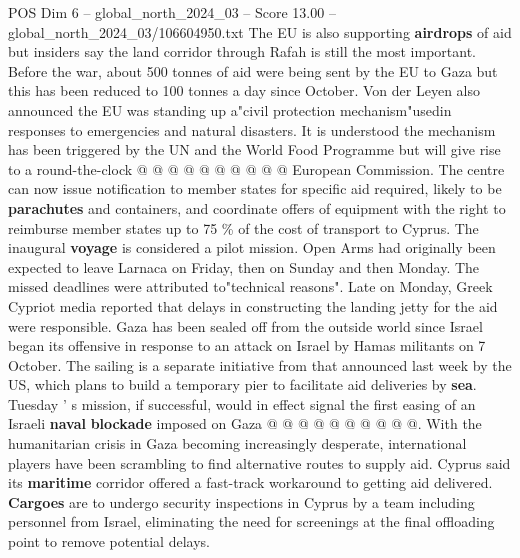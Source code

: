 \begin{textsample}{POS Dim 6 – global\_north\_2024\_03 – Score 13.00 – global\_north\_2024\_03/106604950.txt}
The EU is also supporting \textbf{airdrops} of aid but insiders say the land corridor through Rafah is still the most important.
Before the war, about 500 tonnes of aid were being sent by the EU to Gaza but this has been reduced to 100 tonnes a day since October.
Von der Leyen also announced the EU was standing up a"civil protection mechanism"usedin responses to emergencies and natural disasters.
It is understood the mechanism has been triggered by the UN and the World Food Programme but will give rise to a round-the-clock @ @ @ @ @ @ @ @ @ @ European Commission.
The centre can now issue notification to member states for specific aid required, likely to be \textbf{parachutes} and containers, and coordinate offers of equipment with the right to reimburse member states up to 75 \% of the cost of transport to Cyprus.
The inaugural \textbf{voyage} is considered a pilot mission.
Open Arms had originally been expected to leave Larnaca on Friday, then on Sunday and then Monday.
The missed deadlines were attributed to"technical reasons".
Late on Monday, Greek Cypriot media reported that delays in constructing the landing jetty for the aid were responsible.
Gaza has been sealed off from the outside world since Israel began its offensive in response to an attack on Israel by Hamas militants on 7 October.
The sailing is a separate initiative from that announced last week by the US, which plans to build a temporary pier to facilitate aid deliveries by \textbf{sea}.
Tuesday ' s mission, if successful, would in effect signal the first easing of an Israeli \textbf{naval} \textbf{blockade} imposed on Gaza @ @ @ @ @ @ @ @ @ @.
With the humanitarian crisis in Gaza becoming increasingly desperate, international players have been scrambling to find alternative routes to supply aid.
Cyprus said its \textbf{maritime} corridor offered a fast-track workaround to getting aid delivered. \textbf{Cargoes} are to undergo security inspections in Cyprus by a team including personnel from Israel, eliminating the need for screenings at the final offloading point to remove potential delays.

\end{textsample}
